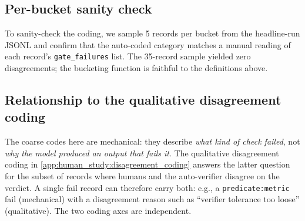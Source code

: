 \subsection{Per-bucket sanity check}
\label{app:failure_coding:sanity}

To sanity-check the coding, we sample 5 records per bucket from the headline-run JSONL and confirm that the auto-coded category matches a manual reading of each record's \texttt{gate\_failures} list.
The 35-record sample yielded zero disagreements; the bucketing function is faithful to the definitions above.

\subsection{Relationship to the qualitative disagreement coding}

The coarse codes here are mechanical: they describe \emph{what kind of check failed}, not \emph{why the model produced an output that fails it}.
The qualitative disagreement coding in \cref{app:human_study:disagreement_coding} answers the latter question for the subset of records where humans and the auto-verifier disagree on the verdict.
A single fail record can therefore carry both: e.g., a \texttt{predicate:metric} fail (mechanical) with a disagreement reason such as ``verifier tolerance too loose'' (qualitative).
The two coding axes are independent.

